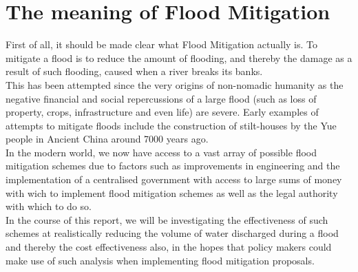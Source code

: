 \documentclass[11 pt, a4paper]{article}
\begin{document}
\newpage
\section{The meaning of Flood Mitigation}
First of all, it should be made clear what Flood Mitigation actually is. To mitigate a flood is to reduce the amount of flooding, and thereby the damage as a result of such flooding, caused when a river breaks its banks.\\ 
This has been attempted since the very origins of non-nomadic humanity as the negative financial and social repercussions of a large flood (such as loss of property, crops, infrastructure and even life) are severe. Early examples of attempts to mitigate floods include the construction of stilt-houses by the Yue people in Ancient China around 7000 years ago.\cite{1}\\ 
In the modern world, we now have access to a vast array of possible flood mitigation schemes due to factors such as improvements in engineering and the implementation of a centralised  government with access to large sums of money with wich to implement flood mitigation schemes as well as the legal authority with which to do so.\\
In the course of this report, we will be investigating the effectiveness of such schemes at realistically reducing the volume of water discharged during a flood and thereby the cost effectiveness also, in the hopes that policy makers could make use of such analysis when implementing flood mitigation proposals.
\end{document}
